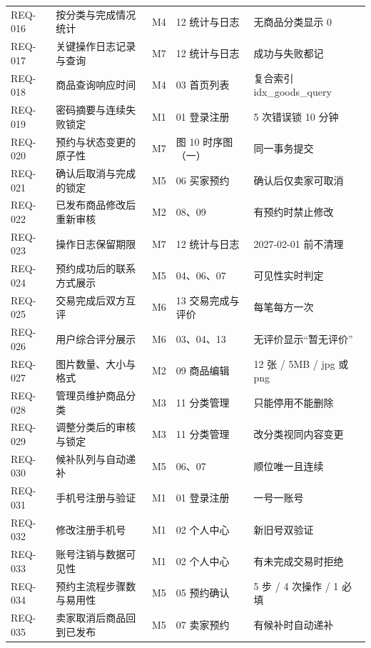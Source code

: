 \documentclass[UTF8,a4paper,12pt]{ctexart}
\begin{document}
{\begin{longtable}{p{1.55cm}p{4.1cm}p{0.8cm}p{3.85cm}p{4.1cm}}
REQ-016 & 按分类与完成情况统计 & M4 & 12 统计与日志 & 无商品分类显示 0 \\
REQ-017 & 关键操作日志记录与查询 & M7 & 12 统计与日志 & 成功与失败都记 \\
REQ-018 & 商品查询响应时间 & M4 & 03 首页列表 & 复合索引 idx\_goods\_query \\
REQ-019 & 密码摘要与连续失败锁定 & M1 & 01 登录注册 & 5 次错误锁 10 分钟 \\
REQ-020 & 预约与状态变更的原子性 & M7 & 图 10 时序图（一） & 同一事务提交 \\
REQ-021 & 确认后取消与完成的锁定 & M5 & 06 买家预约 & 确认后仅卖家可取消 \\
REQ-022 & 已发布商品修改后重新审核 & M2 & 08、09 & 有预约时禁止修改 \\
REQ-023 & 操作日志保留期限 & M7 & 12 统计与日志 & 2027-02-01 前不清理 \\
REQ-024 & 预约成功后的联系方式展示 & M5 & 04、06、07 & 可见性实时判定 \\
REQ-025 & 交易完成后双方互评 & M6 & 13 交易完成与评价 & 每笔每方一次 \\
REQ-026 & 用户综合评分展示 & M6 & 03、04、13 & 无评价显示“暂无评价” \\
REQ-027 & 图片数量、大小与格式 & M2 & 09 商品编辑 & 12 张 / 5MB / jpg 或 png \\
REQ-028 & 管理员维护商品分类 & M3 & 11 分类管理 & 只能停用不能删除 \\
REQ-029 & 调整分类后的审核与锁定 & M3 & 11 分类管理 & 改分类视同内容变更 \\
REQ-030 & 候补队列与自动递补 & M5 & 06、07 & 顺位唯一且连续 \\
REQ-031 & 手机号注册与验证 & M1 & 01 登录注册 & 一号一账号 \\
REQ-032 & 修改注册手机号 & M1 & 02 个人中心 & 新旧号双验证 \\
REQ-033 & 账号注销与数据可见性 & M1 & 02 个人中心 & 有未完成交易时拒绝 \\
REQ-034 & 预约主流程步骤数与易用性 & M5 & 05 预约确认 & 5 步 / 4 次操作 / 1 必填 \\
REQ-035 & 卖家取消后商品回到已发布 & M5 & 07 卖家预约 & 有候补时自动递补 \\
\bottomrule
\end{longtable}
}
\end{document}
